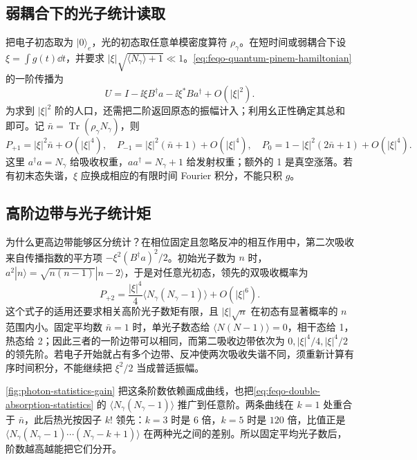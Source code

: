 \subsection{弱耦合下的光子统计读取}

把电子初态取为 \(|0\rangle_e\)，光的初态取任意单模密度算符 \(\rho_\gamma\)。在短时间或弱耦合下设 \(\xi=\int g(t)\dd t\)，并要求 \(|\xi|\sqrt{\langle N_\gamma\rangle+1}\ll1\)。\cref{eq:feqo-quantum-pinem-hamiltonian} 的一阶传播为
\[
U=I-\ii\xi B^\dagger a-\ii\xi^*B a^\dagger+O(|\xi|^2).
\]
为求到 \(|\xi|^2\) 阶的人口，还需把二阶返回原态的振幅计入；利用幺正性确定其总和即可。记 \(\bar n=\operatorname{Tr}(\rho_\gamma N_\gamma)\)，则
\begin{equation}
P_{+1}=|\xi|^2\bar n+O(|\xi|^4),\quad
P_{-1}=|\xi|^2(\bar n+1)+O(|\xi|^4),\quad
P_0=1-|\xi|^2(2\bar n+1)+O(|\xi|^4).
\label{eq:feqo-weak-quantum-populations}
\end{equation}
这里 \(a^\dagger a=N_\gamma\) 给吸收权重，\(aa^\dagger=N_\gamma+1\) 给发射权重；额外的 1 是真空涨落。若有初末态失谐，\(\xi\) 应换成相应的有限时间 Fourier 积分，不能只积 \(g\)。

\subsection{高阶边带与光子统计矩}

为什么更高边带能够区分统计？在相位固定且忽略反冲的相互作用中，第二次吸收来自传播指数的平方项 \(-\xi^2(B^\dagger a)^2/2\)。初始光子数为 \(n\) 时，\(a^2|n\rangle=\sqrt{n(n-1)}|n-2\rangle\)，于是对任意光初态，领先的双吸收概率为
\begin{equation}
P_{+2}=\frac{|\xi|^4}{4}
\langle N_\gamma(N_\gamma-1)\rangle+O(|\xi|^6).
\label{eq:feqo-double-absorption-statistics}
\end{equation}
这个式子的适用还要求相关高阶光子数矩有限，且 \(|\xi|\sqrt n\) 在初态有显著概率的 \(n\) 范围内小。固定平均数 \(\bar n=1\) 时，单光子数态给 \(\langle N(N-1)\rangle=0\)，相干态给 1，热态给 2；因此三者的一阶边带可以相同，而第二吸收边带依次为 \(0,|\xi|^4/4,|\xi|^4/2\) 的领先阶。若电子开始就占有多个边带、反冲使两次吸收失谐不同，须重新计算有序时间积分，不能继续把 \(\xi^2/2\) 当成普适振幅。

\cref{fig:photon-statistics-gain} 把这条阶数依赖画成曲线，也把\cref{eq:feqo-double-absorption-statistics} 的 \(\langle N_\gamma(N_\gamma-1)\rangle\) 推广到任意阶。两条曲线在 \(k=1\) 处重合于 \(\bar n\)，此后热光按因子 \(k!\) 领先：\(k=3\) 时是 \(6\) 倍，\(k=5\) 时是 \(120\) 倍，比值正是 \(\langle N_\gamma(N_\gamma-1)\cdots(N_\gamma-k+1)\rangle\) 在两种光之间的差别。所以固定平均光子数后，阶数越高越能把它们分开。


